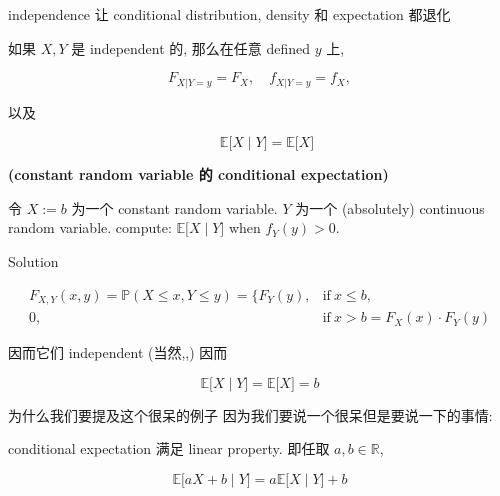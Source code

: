 \documentclass{qlnotes-export}
\begin{document}
\begin{proposition}{independence 让 conditional distribution, density 和 expectation 都退化}\label{prop-03-joint-conditional-distribution-independence-conditional-distribution-density-expectation}

如果 \(X,Y\) 是 independent 的, 那么在任意 defined \(y\) 上,

\[F_{X|Y = y} = F_{X},\quad f_{X|Y = y} = f_{X},\]

以及

\[\left. \quad{\mathbb{E}}\lbrack X \middle| Y\rbrack = {\mathbb{E}}\lbrack X\rbrack \right.\]

\end{proposition}

\begin{example}\label{ex-03-joint-conditional-distribution-example-006}

\textbf{(constant random variable 的 conditional expectation)}

令 \(X := b\) 为一个 constant random variable. \(Y\) 为一个 (absolutely) continuous random variable. compute: \(\left. {\mathbb{E}}\lbrack X \middle| Y\rbrack \right.\) when \(f_{Y}(y) > 0\).

\end{example}

\begin{qlsolution}{Solution}

\[\begin{matrix}
{F_{X,Y}(x,y) = {\mathbb{P}}(X \leq x,Y \leq y) = \{ F_{Y}(y),} & {\text{if}\ x \leq b,} \\
{0,} & {\text{if}\ x > b = F_{X}(x) \cdot F_{Y}(y)}
\end{matrix}\]

因而它们 independent (当然,,) 因而

\[\left. {\mathbb{E}}\lbrack X \middle| Y\rbrack = {\mathbb{E}}\lbrack X\rbrack = b \right.\]

\end{qlsolution}

为什么我们要提及这个很呆的例子 因为我们要说一个很呆但是要说一下的事情:

\begin{proposition}\label{prop-03-joint-conditional-distribution-proposition-010}

conditional expectation 满足 linear property. 即任取 \(a,b \in {\mathbb{R}}\),

\[\left. {\mathbb{E}}\lbrack aX + b \middle| Y\rbrack = a{\mathbb{E}}\lbrack X \middle| Y\rbrack + b \right.\]

\end{proposition}
\end{document}
